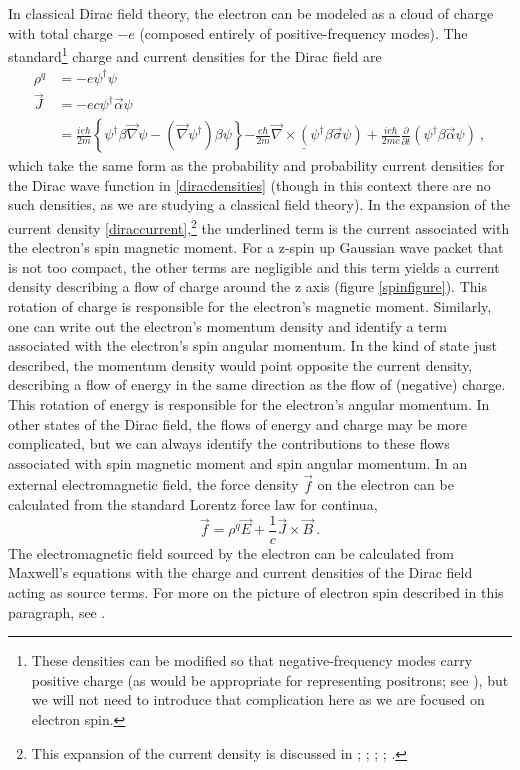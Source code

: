 \documentclass[12pt,onecolumn,secnumarabic,amsmath,amssymb,balancelastpage,nofootinbib]{article}
\begin{document}
In classical Dirac field theory, the electron can be modeled as a cloud of charge with total charge $-e$ (composed entirely of positive-frequency modes).  The standard\footnote{These densities can be modified so that negative-frequency modes carry positive charge (as would be appropriate for representing positrons; see \citealp{positrons}), but we will not need to introduce that complication here as we are focused on electron spin.} charge and current densities for the Dirac field are
\begin{align}
\rho^q&=-e \psi^{\dagger}\psi
\label{diraccharge}
\\
\vec{J}&=-ec \psi^{\dagger}\vec{\alpha}\psi
\nonumber
\\
&=\frac{i e\hbar}{2 m}\left\{\psi^\dagger \beta \vec{\nabla} \psi - (\vec{\nabla} \psi^\dagger) \beta\psi\right\}\underline{ - \frac{e\hbar}{2 m} \vec{\nabla}\times(\psi^\dagger \beta \vec{\sigma}\psi)}+\frac{i e\hbar}{2 m c}\frac{\partial}{\partial t}(\psi^\dagger \beta\vec{\alpha} \psi)
\ ,
\label{diraccurrent}
\end{align}
which take the same form as the probability and probability current densities for the Dirac wave function in \eqref{diracdensities} (though in this context there are no such densities, as we are studying a classical field theory).  In the expansion of the current density \eqref{diraccurrent},\footnote{This expansion of the current density is discussed in \citet{gordon1928}; \citet[pg.\ 321--322]{frenkel}; \citet[pg.\ 479]{huang1952}; \citet{ohanian}; \citet{howelectronsspin, smallelectronstates}.} the underlined term is the current associated with the electron's spin magnetic moment.  For a z-spin up Gaussian wave packet that is not too compact, the other terms are negligible and this term yields a current density describing a flow of charge around the z axis (figure \ref{spinfigure}).  This rotation of charge is responsible for the electron's magnetic moment.  Similarly, one can write out the electron's momentum density and identify a term associated with the electron's spin angular momentum.  In the kind of state just described, the momentum density would point opposite the current density, describing a flow of energy in the same direction as the flow of (negative) charge.  This rotation of energy is responsible for the electron's angular momentum.  In other states of the Dirac field, the flows of energy and charge may be more complicated, but we can always identify the contributions to these flows associated with spin magnetic moment and spin angular momentum.  In an external electromagnetic field, the force density $\vec{f}$ on the electron can be calculated from the standard Lorentz force law for continua,
\begin{equation}
\vec{f}=\rho^q\vec{E}+\frac{1}{c}\vec{J}\times\vec{B}
\ .
\label{forcelaw}
\end{equation}
The electromagnetic field sourced by the electron can be calculated from Maxwell's equations with the charge and current densities of the Dirac field acting as source terms.  For more on the picture of electron spin described in this paragraph, see \citet{ohanian, chuu2010, howelectronsspin, smallelectronstates, spinmeasurement}.
\end{document}
